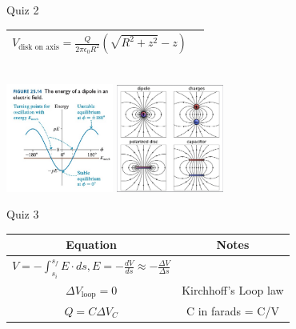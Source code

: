 \documentclass{article}
\begin{document}
\begin{center}
\begin{section}{Quiz 2}
\begin{tabular}{|c|c|}
		 $V_\text{disk on axis}
		 = \frac{Q}{2 \pi \epsilon_0 R^2} \left( \sqrt{R^2 + z^2} - z \right)$           &                                                                            \\



		 \hline
	 \end{tabular}
	 \\
	 \includegraphics[width=100pt]{final_cheet_sheet_resources/gxmdaouxejjbmynkdouerjsizepbpzqv.jpg}
	 \includegraphics[width=100pt]{final_cheet_sheet_resources/wsqwwfonwjqrkuiumpdthpngngyqovlq.jpg}

	\end{section}

	\begin{section}{Quiz 3}
	 \begin{tabular}{|c|c|}
		 \hline
		 Equation                                                                       & Notes                                                                       \\
		 \hline

		 $V = - \int_{s_i}^{s_f} E \cdot ds, E
		 = - \frac{dV}{ds} \approx - \frac{\Delta V}{\Delta s}   $                      &                                                                             \\

		 $\Delta V_\text{loop} = 0 $                                                    & Kirchhoff's Loop law                                                        \\

		 $Q = C \Delta V_C$                                                             & C in farads = C/V                                                           \\


\end{tabular}
\end{section}
\end{center}
\end{document}
